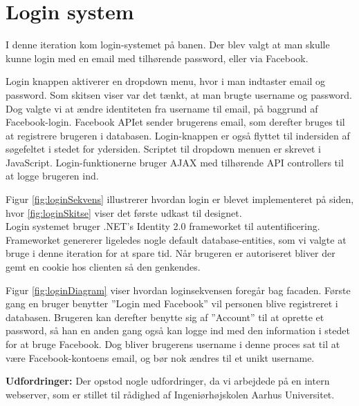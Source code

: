\section{Login system}

I denne iteration kom login-systemet på banen. Der blev valgt at man skulle kunne login med en email med tilhørende password, eller via Facebook.


Login knappen aktiverer en dropdown menu, hvor i man indtaster email og password. Som skitsen viser var det tænkt, at man brugte username og password. Dog valgte vi at ændre identiteten fra username til email, på baggrund af Facebook-login. Facebook APIet sender brugerens email, som derefter bruges til at registrere brugeren i databasen. Login-knappen er også flyttet til indersiden af søgefeltet i stedet for ydersiden. Scriptet til dropdown menuen er skrevet i JavaScript. Login-funktionerne bruger AJAX med tilhørende API controllers til at logge brugeren ind.


Figur \ref{fig:loginSekvens} illustrerer hvordan login er blevet implementeret på siden, hvor \ref{fig:loginSkitse} viser det første udkast til designet. \\

Login systemet bruger .NET's Identity 2.0 frameworket til autentificering. Frameworket genererer ligeledes nogle default database-entities, som vi valgte at bruge i denne iteration for at spare tid. Når brugeren er autoriseret bliver der gemt en cookie hos clienten så den genkendes.



Figur \ref{fig:loginDiagram} viser hvordan loginsekvensen foregår bag facaden. Første gang en bruger benytter ''Login med Facebook'' vil personen blive registreret i databasen. Brugeren kan derefter benytte sig af ''Account'' til at oprette et password, så han en anden gang også kan logge ind med den information i stedet for at bruge Facebook. Dog bliver brugerens username i denne proces sat til at være Facebook-kontoens email, og bør nok ændres til et unikt username.

\textbf{Udfordringer:} 
Der opstod nogle udfordringer, da vi arbejdede på en intern webserver, som er stillet til rådighed af Ingeniørhøjskolen Aarhus Universitet. 

